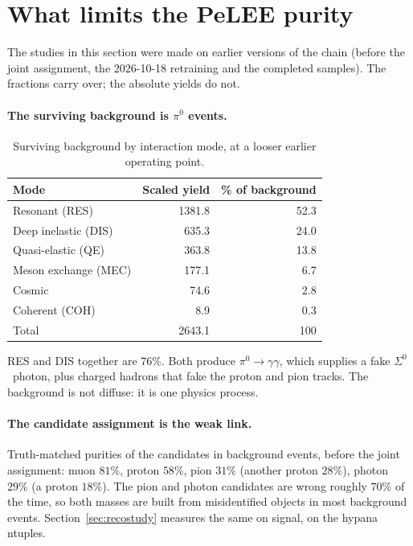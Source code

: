 \documentclass[11pt,a4paper]{article}
\newcommand{\Szero}{\ensuremath{\Sigma^{0}}}
\begin{document}
\section{What limits the PeLEE purity}
\label{sec:purity}

The studies in this section were made on earlier versions of the chain (before the
joint assignment, the 2026-10-18 retraining and the completed samples). The
fractions carry over; the absolute yields do not.

\paragraph{The surviving background is $\pi^0$ events.}
\begin{table}[h]\centering
\caption{Surviving background by interaction mode, at a looser earlier operating
point.}
\begin{tabular}{lrr}
\toprule
Mode & Scaled yield & \% of background \\
\midrule
Resonant (RES)       & 1381.8 & 52.3 \\
Deep inelastic (DIS) &  635.3 & 24.0 \\
Quasi-elastic (QE)   &  363.8 & 13.8 \\
Meson exchange (MEC) &  177.1 &  6.7 \\
Cosmic               &   74.6 &  2.8 \\
Coherent (COH)       &    8.9 &  0.3 \\
\midrule
Total                & 2643.1 & 100 \\
\bottomrule
\end{tabular}
\end{table}

\noindent RES and DIS together are $76\%$. Both produce $\pi^0 \to \gamma\gamma$,
which supplies a fake \Szero\ photon, plus charged hadrons that fake the proton and
pion tracks. The background is not diffuse: it is one physics process.

\paragraph{The candidate assignment is the weak link.} Truth-matched purities of the
candidates in background events, before the joint assignment: muon $81\%$, proton
$58\%$, pion $31\%$ (another proton $28\%$), photon $29\%$ (a proton $18\%$). The pion
and photon candidates are wrong roughly $70\%$ of the time, so both masses are built
from misidentified objects in most background events. Section~\ref{sec:recostudy}
measures the same on signal, on the hypana ntuples.
\end{document}
